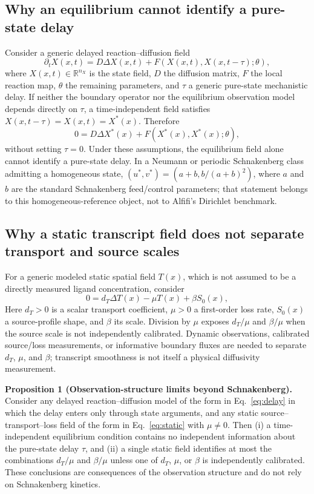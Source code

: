 \documentclass[preprint,11pt]{elsarticle}
\begin{document}
\subsection{Why an equilibrium cannot identify a pure-state delay}
Consider a generic delayed reaction--diffusion field
\begin{equation}
\partial_t X(x,t)=D\Delta X(x,t)+F\!\left(X(x,t),X(x,t-\tau);\theta\right),
\label{eq:delay}
\end{equation}
where $X(x,t)\in\mathbb{R}^{n_X}$ is the state field, $D$ the diffusion matrix, $F$ the local reaction map, $\theta$ the remaining parameters, and $\tau$ a generic pure-state mechanistic delay. If neither the boundary operator nor the equilibrium observation model depends directly on $\tau$, a time-independent field satisfies $X(x,t-\tau)=X(x,t)=X^*(x)$. Therefore
\begin{equation}
0=D\Delta X^*(x)+F\!\left(X^*(x),X^*(x);\theta\right),
\label{eq:eq}
\end{equation}
without setting $\tau=0$. Under these assumptions, the equilibrium field alone cannot identify a pure-state delay. In a Neumann or periodic Schnakenberg class admitting a homogeneous state, $(u^*,v^*)=(a+b,b/(a+b)^2)$, where $a$ and $b$ are the standard Schnakenberg feed/control parameters; that statement belongs to this homogeneous-reference object, not to Alfifi's Dirichlet benchmark.

\subsection{Why a static transcript field does not separate transport and source scales}
For a generic modeled static spatial field $T(x)$, which is not assumed to be a directly measured ligand concentration, consider
\begin{equation}
0=d_T\Delta T(x)-\mu T(x)+\beta S_0(x),
\label{eq:static}
\end{equation}
Here $d_T>0$ is a scalar transport coefficient, $\mu>0$ a first-order loss rate, $S_0(x)$ a source-profile shape, and $\beta$ its scale. Division by $\mu$ exposes $d_T/\mu$ and $\beta/\mu$ when the source scale is not independently calibrated. Dynamic observations, calibrated source/loss measurements, or informative boundary fluxes are needed to separate $d_T$, $\mu$, and $\beta$; transcript smoothness is not itself a physical diffusivity measurement.

\noindent\textbf{Proposition 1 (Observation-structure limits beyond Schnakenberg).} Consider any delayed reaction--diffusion model of the form in Eq.~\eqref{eq:delay} in which the delay enters only through state arguments, and any static source--transport--loss field of the form in Eq.~\eqref{eq:static} with $\mu\neq0$. Then (i) a time-independent equilibrium condition contains no independent information about the pure-state delay $\tau$, and (ii) a single static field identifies at most the combinations $d_T/\mu$ and $\beta/\mu$ unless one of $d_T$, $\mu$, or $\beta$ is independently calibrated. These conclusions are consequences of the observation structure and do not rely on Schnakenberg kinetics.
\end{document}
